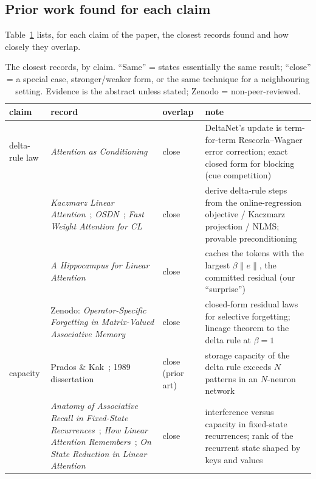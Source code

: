 \subsection{Prior work found for each claim}
Table~\ref{tab:closest} lists, for each claim of the paper, the closest records found and how closely they overlap.
\begin{table}[!htbp]
  \caption{The closest records, by claim. ``Same'' = states essentially the same result; ``close'' = a special case, stronger/weaker form, or the same technique for a neighbouring setting. Evidence is the abstract unless stated; Zenodo = non-peer-reviewed.}\label{tab:closest}
  \centering\scriptsize\setlength{\tabcolsep}{3.5pt}
  \begin{tabular}{>{\raggedright\arraybackslash}p{1.25cm}>{\raggedright\arraybackslash}p{4.6cm}>{\raggedright\arraybackslash}p{1.8cm}>{\raggedright\arraybackslash}p{6.4cm}}
    \toprule
    claim & record & overlap & note \\
    \midrule
    delta-rule law & \textit{Attention as Conditioning} & close & DeltaNet's update is term-for-term Rescorla--Wagner error correction; exact closed form for blocking (cue competition) \\
    & \textit{Kaczmarz Linear Attention}~\citep{zou2026kaczmarz}; \textit{OSDN}~\citep{zhou2026osdn}; \textit{Fast Weight Attention for CL}~\citep{zhang2026fast} & close & derive delta-rule steps from the online-regression objective / Kaczmarz projection / NLMS; provable preconditioning \\
    & \textit{A Hippocampus for Linear Attention}~\citep{cui2026a} & close & caches the tokens with the largest $\beta\|e\|$, the committed residual (our ``surprise'') \\
    & Zenodo: \textit{Operator-Specific Forgetting in Matrix-Valued Associative Memory} & close & closed-form residual laws for selective forgetting; lineage theorem to the delta rule at $\beta{=}1$ \\
    capacity & Prados \& Kak~\citep{prados1989capacity}; 1989 dissertation & close (prior art) & storage capacity of the delta rule exceeds $N$ patterns in an $N$-neuron network \\
    & \textit{Anatomy of Associative Recall in Fixed-State Recurrences}~\citep{boesch2026anatomy}; \textit{How Linear Attention Remembers}~\citep{lee2026how}; \textit{On State Reduction in Linear Attention}~\citep{nazari2026on} & close & interference versus capacity in fixed-state recurrences; rank of the recurrent state shaped by keys and values \\

\end{tabular}
\end{table}
